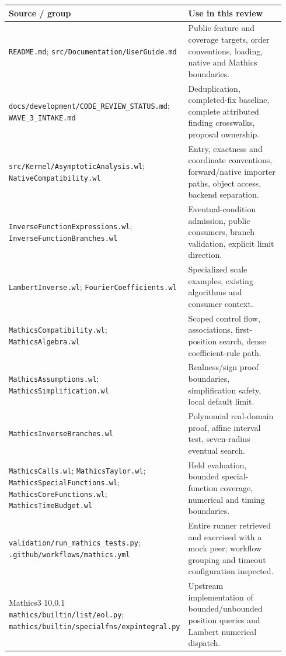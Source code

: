 \documentclass[11pt,a4paper]{article}
\begin{document}
\begin{longtable}{@{}P{0.42\linewidth}P{0.52\linewidth}@{}}
\toprule
Source / group & Use in this review \\
\midrule
\endhead
\nolinkurl{README.md}; \nolinkurl{src/Documentation/UserGuide.md} & Public feature and coverage targets, order conventions, loading, native and Mathics boundaries. \cite{readme,guide} \\
\nolinkurl{docs/development/CODE_REVIEW_STATUS.md}; \nolinkurl{WAVE_3_INTAKE.md} & Deduplication, completed-fix baseline, complete attributed finding crosswalks, proposal ownership. \cite{status,intake} \\
\nolinkurl{src/Kernel/AsymptoticAnalysis.wl}; \nolinkurl{NativeCompatibility.wl} & Entry, exactness and coordinate conventions, forward/native importer paths, object access, backend separation. \cite{core,native} \\
\nolinkurl{InverseFunctionExpressions.wl}; \nolinkurl{InverseFunctionBranches.wl} & Eventual-condition admission, public consumers, branch validation, explicit limit direction. \cite{inverseexpr,branches} \\
\nolinkurl{LambertInverse.wl}; \nolinkurl{FourierCoefficients.wl} & Specialized scale examples, existing algorithms and consumer context. \cite{lambert,fourier} \\
\nolinkurl{MathicsCompatibility.wl}; \nolinkurl{MathicsAlgebra.wl} & Scoped control flow, associations, first-position search, dense coefficient-rule path. \cite{mathicscompat,mathicsalgebra} \\
\nolinkurl{MathicsAssumptions.wl}; \nolinkurl{MathicsSimplification.wl} & Realness/sign proof boundaries, simplification safety, local default limit. \cite{mathicsassumptions,mathicssimplify} \\
\nolinkurl{MathicsInverseBranches.wl} & Polynomial real-domain proof, affine interval test, seven-radius eventual search. \cite{mathicsbranches} \\
\nolinkurl{MathicsCalls.wl}; \nolinkurl{MathicsTaylor.wl}; \nolinkurl{MathicsSpecialFunctions.wl}; \nolinkurl{MathicsCoreFunctions.wl}; \nolinkurl{MathicsTimeBudget.wl} & Held evaluation, bounded special-function coverage, numerical and timing boundaries. \cite{mathicscalls,mathicstaylor,mathicsspecial,mathicscore,mathicstime} \\
\nolinkurl{validation/run_mathics_tests.py}; \nolinkurl{.github/workflows/mathics.yml} & Entire runner retrieved and exercised with a mock peer; workflow grouping and timeout configuration inspected. \cite{runner,workflow} \\
Mathics3 10.0.1 \nolinkurl{mathics/builtin/list/eol.py}; \nolinkurl{mathics/builtin/specialfns/expintegral.py} & Upstream implementation of bounded/unbounded position queries and Lambert numerical dispatch. \cite{mathicsposition,mathicsproductlog} \\
\bottomrule
\end{longtable}
\end{document}
